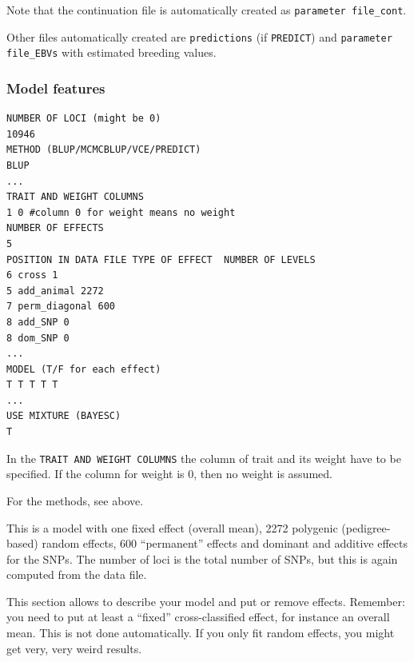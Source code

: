\documentclass[a4paper,12pt,titlepage]{article}      %
\begin{document}
Note that the continuation file is automatically created as \newline \mbox{\texttt{parameter file\_cont}}.

Other files automatically created are \mbox{\texttt{predictions}} (if \verb|PREDICT|) and 
\newline \mbox{\texttt{parameter file\_EBVs}} with estimated breeding values.


\subsubsection{Model features}

\begin{verbatim}
NUMBER OF LOCI (might be 0)
10946
METHOD (BLUP/MCMCBLUP/VCE/PREDICT)
BLUP
...
TRAIT AND WEIGHT COLUMNS
1 0 #column 0 for weight means no weight
NUMBER OF EFFECTS
5
POSITION IN DATA FILE TYPE OF EFFECT  NUMBER OF LEVELS
6 cross 1
5 add_animal 2272
7 perm_diagonal 600
8 add_SNP 0
8 dom_SNP 0
...
MODEL (T/F for each effect)
T T T T T
...
USE MIXTURE (BAYESC)
T
\end{verbatim}




In the \texttt{TRAIT AND WEIGHT COLUMNS} the column of trait and its weight have to be specified.  If the column for weight is 0, then no weight is assumed.


For the methods, see above.
 
This is a model with one fixed effect (overall mean), 2272 polygenic (pedigree-based) random effects, 600 ``permanent'' effects and dominant and additive effects for the SNPs. The number of loci is the total number of SNPs, but this is again computed from the data file.

This section allows to describe your model and put or remove effects. { \Huge Remember: you need to put at least a ``fixed'' cross-classified effect, for instance an overall mean. This is not done automatically.} If you only fit random effects, you might get very, very weird results.
\end{document}
